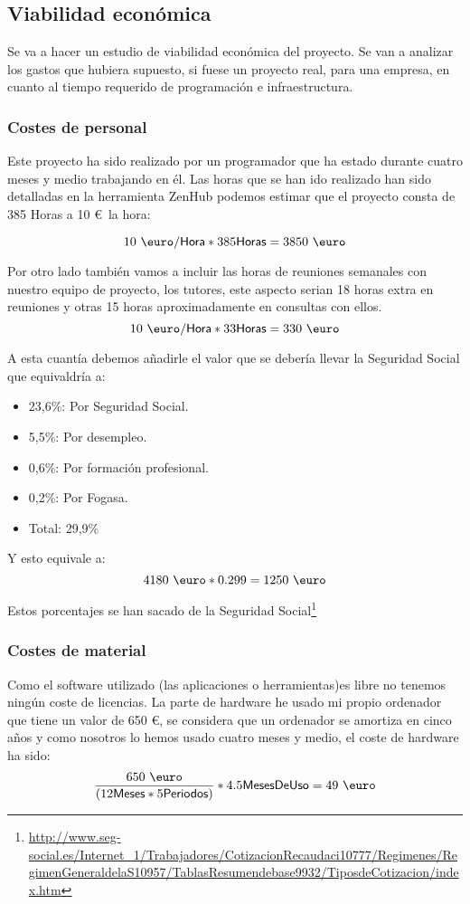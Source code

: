 \subsection{Viabilidad económica}
Se va a hacer un estudio de viabilidad económica del proyecto. Se van a analizar los gastos que hubiera supuesto, si fuese un proyecto real, para una empresa, en cuanto al tiempo requerido de programación e infraestructura.
\subsubsection{Costes de personal}
Este proyecto ha sido realizado por un programador que ha estado durante cuatro meses y medio trabajando en él.
Las horas que se han ido realizado han sido detalladas en la herramienta ZenHub podemos estimar que el proyecto consta de 385 Horas a 10 \euro~la hora:

\[10~{\mbox{\euro}} /\textsf{Hora}*385\textsf{Horas}=3850~{\mbox{\euro}}\]

Por otro lado también vamos a incluir las horas de reuniones semanales con nuestro equipo de proyecto, los tutores, este aspecto serian 18 horas extra en reuniones y otras 15 horas aproximadamente en consultas con ellos.
\[10~{\mbox{\euro}} /\textsf{Hora}*33\textsf{Horas}=330 ~{\mbox{\euro}} \]

A esta cuantía debemos añadirle el valor que se debería llevar la Seguridad Social que equivaldría a:
\begin{itemize}
\item 23,6\%: Por Seguridad Social.
\item 5,5\%: Por desempleo.
\item 0,6\%: Por formación profesional.
\item 0,2\%: Por Fogasa.
\item Total: 29,9\% 
\end{itemize}
Y esto equivale a: 
\[4180~{\mbox{\euro}}*0.299=1250~{\mbox{\euro}}\]

Estos porcentajes se han sacado de la Seguridad Social\footnote{\url{http://www.seg-social.es/Internet_1/Trabajadores/CotizacionRecaudaci10777/Regimenes/RegimenGeneraldelaS10957/TablasResumendebase9932/TiposdeCotizacion/index.htm}}
\subsubsection{Costes de material}
Como el software utilizado (las aplicaciones o herramientas)es libre no tenemos ningún coste de licencias. La parte de hardware he usado mi propio ordenador que tiene un valor de 650 \euro, se considera que un ordenador se amortiza en cinco años y como nosotros lo hemos usado cuatro meses y medio, el coste de hardware ha sido:
\[\frac{650~{\mbox{\euro}}}{(12\textsf{Meses}*5\textsf{Periodos})}*4.5\textsf{MesesDeUso}=49~{\mbox{\euro}}\]
